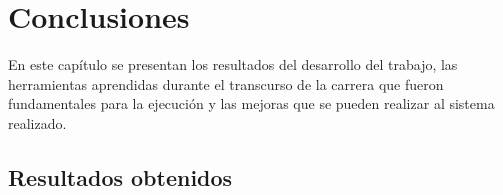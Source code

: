 
\chapter{Conclusiones} %

\label{Chapter5} %

En este capítulo se presentan los resultados del desarrollo del trabajo,  las herramientas aprendidas durante el transcurso de la carrera que fueron fundamentales para la ejecución y las mejoras que se pueden realizar al sistema realizado.



\section{Resultados obtenidos}





